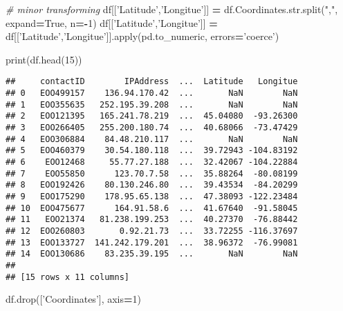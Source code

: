 \documentclass[
]{article}
\newenvironment{Shaded}{\begin{snugshade}}{\end{snugshade}}
\newcommand{\BuiltInTok}[1]{#1}
\newcommand{\CommentTok}[1]{\textcolor[rgb]{0.56,0.35,0.01}{\textit{#1}}}
\newcommand{\DecValTok}[1]{\textcolor[rgb]{0.00,0.00,0.81}{#1}}
\newcommand{\NormalTok}[1]{#1}
\newcommand{\OperatorTok}[1]{\textcolor[rgb]{0.81,0.36,0.00}{\textbf{#1}}}
\newcommand{\StringTok}[1]{\textcolor[rgb]{0.31,0.60,0.02}{#1}}
\newcommand{\VariableTok}[1]{\textcolor[rgb]{0.00,0.00,0.00}{#1}}
\begin{document}
\begin{Shaded}
\begin{Highlighting}[]
\CommentTok{# minor transforming }
\NormalTok{df[[}\StringTok{'Latitude'}\NormalTok{,}\StringTok{'Longitue'}\NormalTok{]] }\OperatorTok{=}\NormalTok{ df.Coordinates.}\BuiltInTok{str}\NormalTok{.split(}\StringTok{","}\NormalTok{, expand}\OperatorTok{=}\VariableTok{True}\NormalTok{, n}\OperatorTok{=-}\DecValTok{1}\NormalTok{)}
\NormalTok{df[[}\StringTok{'Latitude'}\NormalTok{,}\StringTok{'Longitue'}\NormalTok{]] }\OperatorTok{=}\NormalTok{ df[[}\StringTok{'Latitude'}\NormalTok{,}\StringTok{'Longitue'}\NormalTok{]].}\BuiltInTok{apply}\NormalTok{(pd.to_numeric, errors}\OperatorTok{=}\StringTok{'coerce'}\NormalTok{)}

\BuiltInTok{print}\NormalTok{(df.head(}\DecValTok{15}\NormalTok{))}
\end{Highlighting}
\end{Shaded}

\begin{verbatim}
##     contactID        IPAddress  ...  Latitude   Longitue
## 0   EOO499157    136.94.170.42  ...       NaN        NaN
## 1   EOO355635   252.195.39.208  ...       NaN        NaN
## 2   EOO121395   165.241.78.219  ...  45.04080  -93.26300
## 3   EOO266405   255.200.180.74  ...  40.68066  -73.47429
## 4   EOO306884    84.48.210.117  ...       NaN        NaN
## 5   EOO460379    30.54.180.118  ...  39.72943 -104.83192
## 6    EOO12468     55.77.27.188  ...  32.42067 -104.22884
## 7    EOO55850      123.70.7.58  ...  35.88264  -80.08199
## 8   EOO192426    80.130.246.80  ...  39.43534  -84.20299
## 9   EOO175290    178.95.65.138  ...  47.38093 -122.23484
## 10  EOO475677      164.91.58.6  ...  41.67640  -91.58045
## 11   EOO21374   81.238.199.253  ...  40.27370  -76.88442
## 12  EOO260803       0.92.21.73  ...  33.72255 -116.37697
## 13  EOO133727  141.242.179.201  ...  38.96372  -76.99081
## 14  EOO130686    83.235.39.195  ...       NaN        NaN
## 
## [15 rows x 11 columns]
\end{verbatim}

\begin{Shaded}
\begin{Highlighting}[]
\NormalTok{df.drop([}\StringTok{'Coordinates'}\NormalTok{], axis}\OperatorTok{=}\DecValTok{1}\NormalTok{)}
\end{Highlighting}
\end{Shaded}
\end{document}
